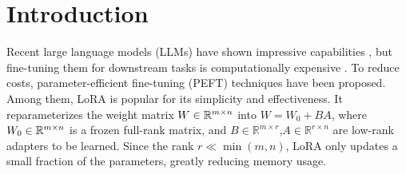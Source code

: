 \section{Introduction}

Recent large language models (LLMs) have shown impressive capabilities \cite{dai2024deepseekmoeultimateexpertspecialization,touvron2023llama2openfoundation,yang2024qwen2technicalreport,openai2024gpt4technicalreport}, but fine-tuning them for downstream tasks is computationally expensive \cite{hulora,zhao2024galorememoryefficientllmtraining}. To reduce costs, parameter-efficient fine-tuning (PEFT) techniques \cite{hulora,pfeiffer2021adapterfusion,houlsby2019parameter,tian2024hydraloraasymmetricloraarchitecture} have been proposed. Among them, LoRA \cite{hulora} is popular for its simplicity and effectiveness. It reparameterizes the weight matrix $W \in {\mathbb{R}}^{m \times n}$ into \(W = W_0 + BA\), where $W_0 \in {\mathbb{R}}^{m\times n}$ is a frozen full-rank matrix, and \(B \in \mathbb{R}^{m \times r}\),\(A \in \mathbb{R}^{r \times n}\) are low-rank adapters to be learned. 
Since the rank $r \ll \min(m,n)$, LoRA only updates a small fraction of the parameters, greatly reducing memory usage.


